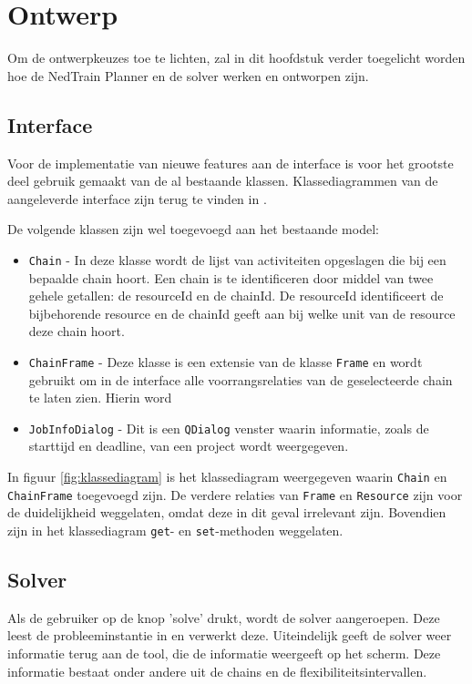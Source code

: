 \section{Ontwerp}
Om de ontwerpkeuzes toe te lichten, zal in dit hoofdstuk verder toegelicht worden hoe de NedTrain Planner en de solver werken en ontworpen zijn.

\subsection{Interface}
Voor de implementatie van nieuwe features aan de interface is voor het grootste deel gebruik gemaakt van de al bestaande klassen. Klassediagrammen van de aangeleverde interface zijn terug te vinden in \cite{bep2012nedtrain}.

De volgende klassen zijn wel toegevoegd aan het bestaande model:
\begin{itemize}
\item \texttt{Chain} - In deze klasse wordt de lijst van activiteiten opgeslagen die bij een bepaalde chain hoort. Een chain is te identificeren door middel van twee gehele getallen: de resourceId en de chainId. De resourceId identificeert de bijbehorende resource en de chainId geeft aan bij welke unit van de resource deze chain hoort.
\item \texttt{ChainFrame} - Deze klasse is een extensie van de klasse \texttt{Frame} en wordt gebruikt om in de interface alle voorrangsrelaties van de geselecteerde chain te laten zien. Hierin word
\item \texttt{JobInfoDialog} - Dit is een \texttt{QDialog} venster waarin informatie, zoals de starttijd en deadline, van een project wordt weergegeven.
\end{itemize}

In figuur \ref{fig:klassediagram} is het klassediagram weergegeven waarin \texttt{Chain} en \texttt{ChainFrame} toegevoegd zijn. De verdere relaties van \texttt{Frame} en \texttt{Resource} zijn voor de duidelijkheid weggelaten, omdat deze in dit geval irrelevant zijn. Bovendien zijn in het klassediagram \texttt{get}- en \texttt{set}-methoden weggelaten.

\subsection{Solver}
Als de gebruiker op de knop 'solve' drukt, wordt de solver aangeroepen. Deze leest de probleeminstantie in en verwerkt deze. Uiteindelijk geeft de solver weer informatie terug aan de tool, die de informatie weergeeft op het scherm. Deze informatie bestaat onder andere uit de chains en de flexibiliteitsintervallen.

